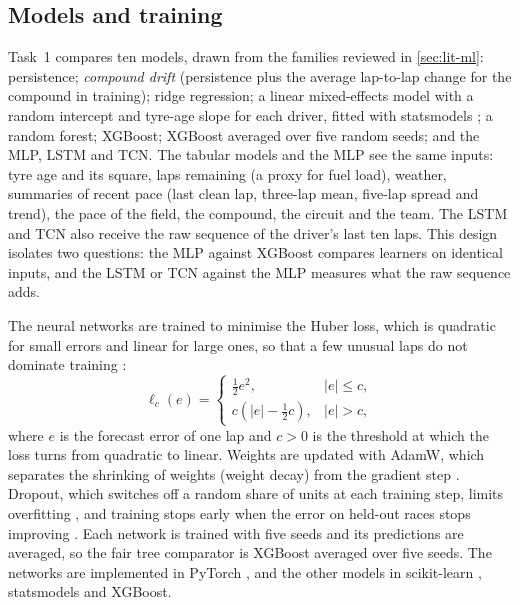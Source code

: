 \documentclass[12pt]{article}
\begin{document}
\subsection{Models and training}\label{sec:models}

Task~1 compares ten models, drawn from the families reviewed in \cref{sec:lit-ml}: persistence; \emph{compound drift}
(persistence plus the average lap-to-lap change for the compound in training); ridge regression; a linear mixed-effects
model with a random intercept and tyre-age slope for each driver, fitted with statsmodels \parencite{seabold2010}; a
random forest; XGBoost; XGBoost averaged over five random seeds; and the MLP, LSTM and TCN. The tabular models and the
MLP see the same inputs: tyre age and its square, laps remaining (a proxy for fuel load), weather, summaries of recent
pace (last clean lap, three-lap mean, five-lap spread and trend), the pace of the field, the compound, the circuit and
the team. The LSTM and TCN also receive the raw sequence of the driver's last ten laps. This design isolates two
questions: the MLP against XGBoost compares learners on identical inputs, and the LSTM or TCN against the MLP measures
what the raw sequence adds.

The neural networks are trained to minimise the Huber loss, which is quadratic for small errors and linear for large
ones, so that a few unusual laps do not dominate training \parencite{huber1964}:
\begin{equation}\label{eq:huber}
  \ell_{c}(e) =
  \begin{cases}
    \tfrac12 e^{2}, & |e|\le c,\\[2pt]
    c\left(|e|-\tfrac12 c\right), & |e|>c,
  \end{cases}
\end{equation}
where $e$ is the forecast error of one lap and $c>0$ is the threshold at which the loss turns from quadratic to linear.
Weights are updated with AdamW, which separates the shrinking of weights (weight decay) from the gradient step
\parencite{loshchilov2019}. Dropout, which switches off a random share of units at each training step, limits
overfitting \parencite{srivastava2014}, and training stops early when the error on held-out races stops improving
\parencite{prechelt1998}. Each network is trained with five seeds and its predictions are averaged, so the fair tree
comparator is XGBoost averaged over five seeds. The networks are implemented in PyTorch \parencite{paszke2019}, and
the other models in scikit-learn \parencite{pedregosa2011}, statsmodels and XGBoost.
\end{document}
